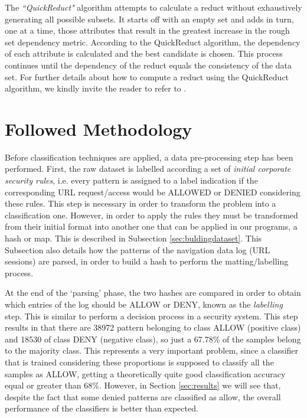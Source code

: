 \documentclass{llncs}
\begin{document}
The \emph{``QuickReduct"} algorithm  attempts to calculate a reduct without exhaustively generating all possible subsets. It starts off with an empty set and adds in turn, one at a time, those attributes that result in the greatest increase in the rough set dependency metric. According to the QuickReduct algorithm, the dependency of each attribute is calculated and the best candidate is chosen. This process continues until the dependency of the reduct equals the consistency of the data set.
For further details about how to compute a  reduct using the   QuickReduct algorithm, we kindly invite the reader to refer to  \cite{shen2007rough}.


%

\section{Followed Methodology}
\label{sec:methodology}

\noindent Before classification techniques are applied, a data
pre-processing step has been performed. First, the raw dataset is
labelled according a set of \textit{initial corporate security rules},
i.e. every pattern is assigned to a label indication if the
corresponding URL request/access would be ALLOWED or DENIED
considering these rules. This step is necessary in order to transform
the problem into a classification one. However, in order to apply the
rules they must be transformed from their initial format into another
one that can be applied in our programs, a hash or map. This is
described in Subsection 
\ref{sec:buldingdataset}. This Subsection also details how the
patterns of the navigation data log (URL sessions) are parsed, in
order to build a hash to perform the matting/labelling process. 

At the end of the `parsing' phase, the two hashes are compared in order to obtain which entries of the log should be ALLOW or DENY, known as the \textit{labelling} step. This is similar to perform a decision process in a security system. This step results in that there are 38972 pattern belonging to class ALLOW (positive class) and 18530 of class DENY (negative class), so just a 67.78\% of the samples belong to the majority class. This represents a very important problem, since a classifier that is trained considering these proportions is supposed to classify all the samples as ALLOW, getting a theoretically quite good classification accuracy equal or greater than 68\%. However, in Section \ref{sec:results} we will see that, despite the fact that some denied patterns are classified as allow, the overall performance of the classifiers is better than expected.
\end{document}
